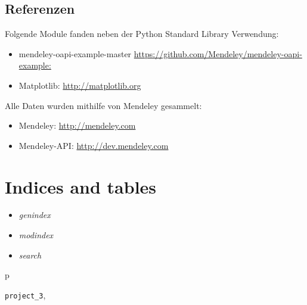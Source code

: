 \documentclass[letterpaper,10pt,english]{sphinxmanual}
\begin{document}
\section{Referenzen}
\label{project_3:referenzen}
Folgende Module fanden neben der Python Standard Library Verwendung:
\begin{itemize}
\item {} 
mendeley-oapi-example-master \href{https://github.com/Mendeley/mendeley-oapi-example/}{https://github.com/Mendeley/mendeley-oapi-example:}

\item {} 
Matplotlib: \href{http://matplotlib.org/}{http://matplotlib.org}

\end{itemize}

Alle Daten wurden mithilfe von Mendeley gesammelt:
\begin{itemize}
\item {} 
Mendeley: \href{http://mendeley.com/}{http://mendeley.com}

\item {} 
Mendeley-API: \href{http://dev.mendeley.com/}{http://dev.mendeley.com}

\end{itemize}


\chapter{Indices and tables}
\label{index:indices-and-tables}\begin{itemize}
\item {} 
\emph{genindex}

\item {} 
\emph{modindex}

\item {} 
\emph{search}

\end{itemize}


\renewcommand{\indexname}{Python Module Index}
\begin{theindex}
\def\bigletter#1{{\Large\sffamily#1}\nopagebreak\vspace{1mm}}
\bigletter{p}
\item {\texttt{project\_3}}, \pageref{project_3:module-project_3}
\end{theindex}

\renewcommand{\indexname}{Index}
\printindex
\end{document}
